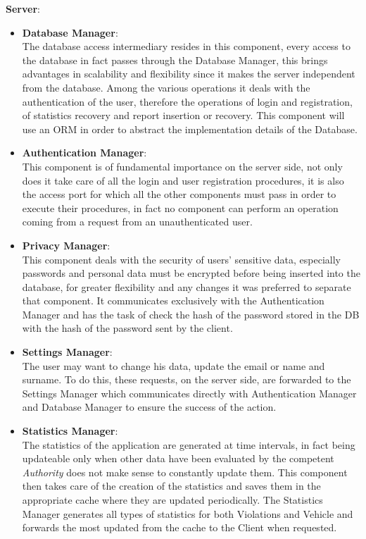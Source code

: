 \documentclass{article}
\begin{document}
\textbf{Server}:

\begin{itemize}

\item \textbf{Database Manager}: \\
The database access intermediary resides in this component, every access to the database in 
fact passes through the Database Manager, this brings advantages in scalability and flexibility 
since it makes the server independent from the database. Among the various operations it deals 
with the authentication of the user, therefore the operations of login and registration, 
of statistics recovery and report insertion or recovery. This component will use an 
ORM in order to abstract the implementation details of the Database.

\item \textbf{Authentication Manager}: \\
This component is of fundamental importance on the server side, not only does it take care 
of all the login and user registration procedures, it is also the access port for which all 
the other components must pass in order to execute their procedures, in fact no component 
can perform an operation coming from a request from an unauthenticated user.

\item \textbf{Privacy Manager}: \\
This component deals with the security of users' sensitive data, especially passwords 
and personal data must be encrypted before being inserted into the database, for greater 
flexibility and any changes it was preferred to separate that component. 
It communicates exclusively with the Authentication Manager and has the task 
of check the hash of the password stored in the DB with the hash of the 
password sent by the client.

\item \textbf{Settings Manager}: \\
The user may want to change his data, update the email or name and surname. To do this, these 
requests, on the server side, are forwarded to the Settings Manager which communicates directly 
with Authentication Manager and Database Manager to ensure the success of the action. 

\item \textbf{Statistics Manager}: \\
The statistics of the application are generated at time intervals, in fact being 
updateable only when other data have been evaluated by the competent \textit{Authority} does 
not make sense to constantly update them. This component then takes care of the creation 
of the statistics and saves them in the appropriate cache where they are updated periodically. 
The Statistics Manager generates all types of statistics for both Violations and Vehicle and 
forwards the most updated from the cache to the Client when requested.


\end{itemize}
\end{document}
